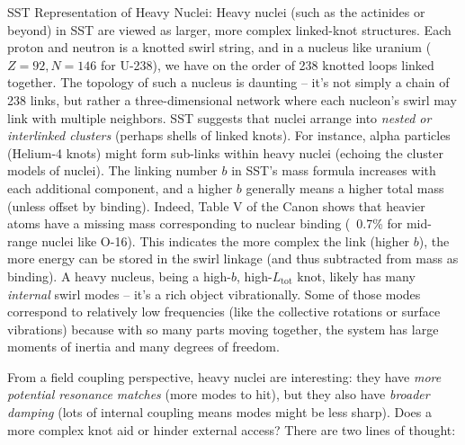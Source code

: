 \documentclass[11pt]{article}
\begin{document}
SST Representation of Heavy Nuclei: Heavy nuclei (such as the actinides or beyond) in SST are viewed as larger, more complex linked-knot structures. Each proton and neutron is a knotted swirl string, and in a nucleus like uranium ($Z=92,N=146$ for U-238), we have on the order of 238 knotted loops linked together. The topology of such a nucleus is daunting – it’s not simply a chain of 238 links, but rather a three-dimensional network where each nucleon’s swirl may link with multiple neighbors. SST suggests that nuclei arrange into \textit{nested or interlinked clusters} (perhaps shells of linked knots). For instance, alpha particles (Helium-4 knots) might form sub-links within heavy nuclei (echoing the cluster models of nuclei). The linking number $b$ in SST’s mass formula increases with each additional component, and a higher $b$ generally means a higher total mass (unless offset by binding). Indeed, Table V of the Canon shows that heavier atoms have a missing mass corresponding to nuclear binding (~0.7\% for mid-range nuclei like O-16). This indicates the more complex the link (higher $b$), the more energy can be stored in the swirl linkage (and thus subtracted from mass as binding). A heavy nucleus, being a high-$b$, high-$L_{\text{tot}}$ knot, likely has many \textit{internal} swirl modes – it’s a rich object vibrationally. Some of those modes correspond to relatively low frequencies (like the collective rotations or surface vibrations) because with so many parts moving together, the system has large moments of inertia and many degrees of freedom.


From a field coupling perspective, heavy nuclei are interesting: they have \textit{more potential resonance matches} (more modes to hit), but they also have \textit{broader damping} (lots of internal coupling means modes might be less sharp). Does a more complex knot aid or hinder external access? There are two lines of thought:
\end{document}
